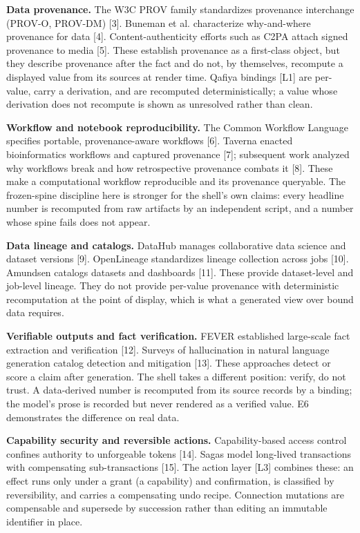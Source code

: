 \documentclass[11pt,a4paper]{article}
\begin{document}
\textbf{Data provenance.} The W3C PROV family standardizes provenance interchange (PROV-O, PROV-DM) [3]. Buneman et al. characterize why-and-where provenance for data [4]. Content-authenticity efforts such as C2PA attach signed provenance to media [5]. These establish provenance as a first-class object, but they describe provenance after the fact and do not, by themselves, recompute a displayed value from its sources at render time. Qafiya bindings [L1] are per-value, carry a derivation, and are recomputed deterministically; a value whose derivation does not recompute is shown as unresolved rather than clean.

\textbf{Workflow and notebook reproducibility.} The Common Workflow Language specifies portable, provenance-aware workflows [6]. Taverna enacted bioinformatics workflows and captured provenance [7]; subsequent work analyzed why workflows break and how retrospective provenance combats it [8]. These make a computational workflow reproducible and its provenance queryable. The frozen-spine discipline here is stronger for the shell's own claims: every headline number is recomputed from raw artifacts by an independent script, and a number whose spine fails does not appear.

\textbf{Data lineage and catalogs.} DataHub manages collaborative data science and dataset versions [9]. OpenLineage standardizes lineage collection across jobs [10]. Amundsen catalogs datasets and dashboards [11]. These provide dataset-level and job-level lineage. They do not provide per-value provenance with deterministic recomputation at the point of display, which is what a generated view over bound data requires.

\textbf{Verifiable outputs and fact verification.} FEVER established large-scale fact extraction and verification [12]. Surveys of hallucination in natural language generation catalog detection and mitigation [13]. These approaches detect or score a claim after generation. The shell takes a different position: verify, do not trust. A data-derived number is recomputed from its source records by a binding; the model's prose is recorded but never rendered as a verified value. E6 demonstrates the difference on real data.

\textbf{Capability security and reversible actions.} Capability-based access control confines authority to unforgeable tokens [14]. Sagas model long-lived transactions with compensating sub-transactions [15]. The action layer [L3] combines these: an effect runs only under a grant (a capability) and confirmation, is classified by reversibility, and carries a compensating undo recipe. Connection mutations are compensable and supersede by succession rather than editing an immutable identifier in place.
\end{document}
